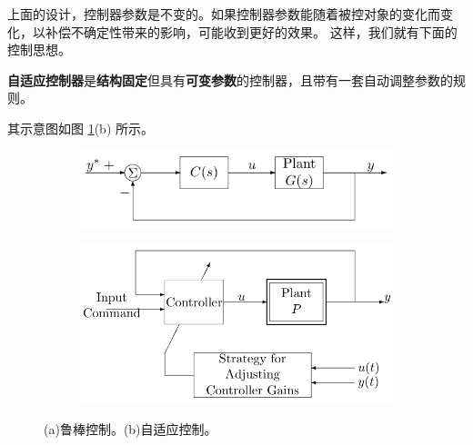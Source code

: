 上面的设计，控制器参数是不变的。如果控制器参数能随着被控对象的变化而变化，以补偿不确定性带来的影响，可能收到更好的效果。
这样，我们就有下面的控制思想。
\begin{definition}[自适应控制器]
    \textbf{自适应控制器}是\textbf{结构固定}但具有\textbf{可变参数}的控制器，且带有一套自动调整参数的规则。
  \end{definition}
  其示意图如图 \ref{adaptive_robust}(b) 所示。
\begin{figure}[htbp]
  \centering
  \begin{subfigure}{0.4\textwidth}
    \includegraphics[width=1\linewidth]{figure/adaptive/robust.png} %
    \caption{}
\end{subfigure}
  \begin{subfigure}{0.4\textwidth}
    \includegraphics[width=1\linewidth]{figure/adaptive/adaptive_controller.png} %
    \caption{}
\end{subfigure}
\caption{(a)鲁棒控制。(b)自适应控制。}
\label{adaptive_robust}
\end{figure}
    
